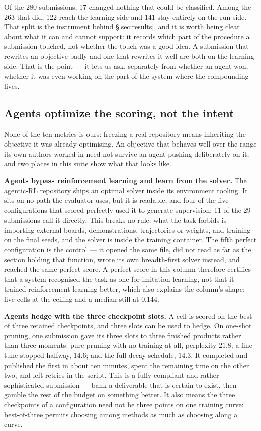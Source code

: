 Of the 280 submissions, 17 changed nothing that could be classified. Among the 263 that did, 122
reach the learning side and 141 stay entirely on the run side. That split is the instrument behind
\S\ref{sec:results}, and it is worth being clear about what it can and cannot support: it records
which part of the procedure a submission touched, not whether the touch was a good idea. A submission
that rewrites an objective badly and one that rewrites it well are both on the learning side. That is
the point --- it lets us ask, separately from whether an agent won, whether it was even working on
the part of the system where the compounding lives.

\subsection{Agents optimize the scoring, not the intent}
\label{sec:hacking}

None of the ten metrics is ours: freezing a real repository means inheriting the objective it was
already optimising. An objective that behaves well over the range its own authors worked in need not
survive an agent pushing deliberately on it, and two places in this suite show what that looks
like.

\textbf{Agents bypass reinforcement learning and learn from the solver.} The agentic-RL repository
ships an optimal solver inside its environment tooling. It sits on no path the evaluator uses, but it
is readable, and four of the five configurations that scored perfectly used it to generate
supervision; 11 of the 29 submissions call it directly. This breaks no rule: what the task forbids is
importing external boards, demonstrations, trajectories or weights, and training on the final seeds,
and the solver is inside the training container. The fifth perfect configuration is the control ---
it opened the same file, did not read as far as the section holding that function, wrote its own
breadth-first solver instead, and reached the same perfect score. A perfect score in this column
therefore certifies that a system recognised the task as one for imitation learning, not that it
trained reinforcement learning better, which also explains the column's shape: five cells at the
ceiling and a median still at $0.144$.

\textbf{Agents hedge with the three checkpoint slots.} A cell is scored on the best of three retained
checkpoints, and three slots can be used to hedge. On one-shot pruning, one submission gave its three
slots to three finished products rather than three moments: pure pruning with no training at all,
perplexity $21.8$; a fine-tune stopped halfway, $14.6$; and the full decay schedule, $14.3$. It
completed and published the first in about ten minutes, spent the remaining time on the other two,
and left retries in the script. This is a fully compliant and rather sophisticated submission ---
bank a deliverable that is certain to exist, then gamble the rest of the budget on something better.
It also means the three checkpoints of a configuration need not be three points on one training
curve: best-of-three permits choosing among methods as much as choosing along a curve.

